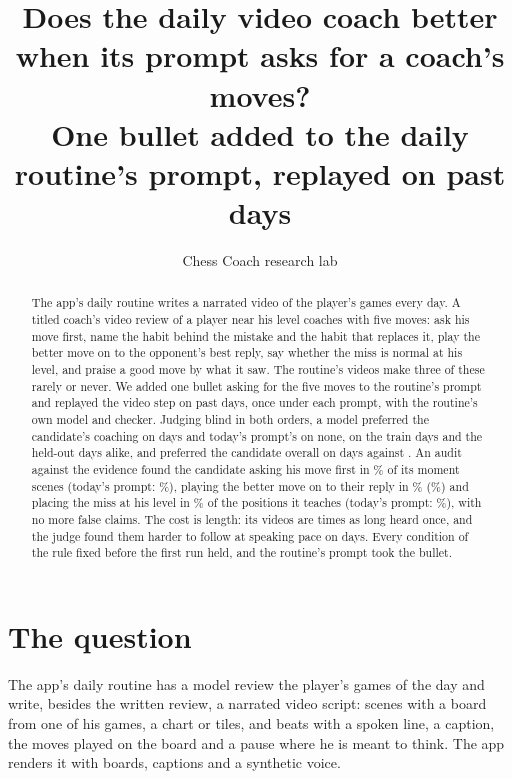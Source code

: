 \documentclass[11pt]{article}
\title{Does the daily video coach better when its prompt asks for a coach's moves?\\[0.3em]
\large One bullet added to the daily routine's prompt, replayed on \Cases{} past days}
\author{Chess Coach research lab}
\date{}
\begin{document}
\maketitle

\begin{abstract}
The app's daily routine writes a narrated video of the player's games every day. A titled
coach's video review of a player near his level coaches with five moves: ask his move first, name the
habit behind the mistake and the habit that replaces it, play the better move on to the opponent's
best reply, say whether the miss is normal at his level, and praise a good move by what it saw. The
routine's videos make three of these rarely or never. We added one bullet asking for the five moves
to the routine's prompt and replayed the video step on \Cases{} past days, once under each prompt,
with the routine's own model and checker. Judging blind in both orders, a model preferred the
candidate's coaching on \CoachingWins{} days and today's prompt's on none, on the train days and the
held-out days alike, and preferred the candidate overall on \OverallWins{} days against
\OverallLosses. An audit against the evidence found the candidate asking his move first in
\CandOpenQuestion\% of its moment scenes (today's prompt: \BaseOpenQuestion\%), playing the better
move on to their reply in \CandThenWhat\% (\BaseThenWhat\%) and placing the miss at his level in
\CandToldLevel\% of the positions it teaches (today's prompt: \BaseToldLevel\%), with no more false
claims. The cost is length: its videos are \LengthRatio{} times as long heard once, and the judge
found them harder to follow at speaking pace on \ListeningLosses{} days. Every condition of the
rule fixed before the first run held, and the routine's prompt took the bullet.
\end{abstract}

\section{The question}

The app's daily routine has a model review the player's games of the day and write, besides the
written review, a narrated video script: scenes with a board from one of his games, a chart or
tiles, and beats with a spoken line, a caption, the moves played on the board and a pause where he
is meant to think. The app renders it with boards, captions and a synthetic voice.
\end{document}
